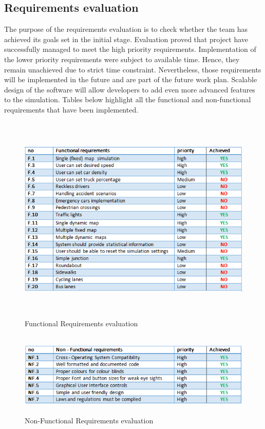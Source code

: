 \subsection{Requirements evaluation}
  The purpose of the requirements evaluation is to check whether the team has achieved its goals set in the initial stage. Evaluation proved that project have successfully managed to meet the high priority requirements. Implementation of the lower priority requirements were subject to available time. Hence, they remain unachieved due to strict time constraint. Nevertheless, those requirements will be implemented in the future and are part of the future work plan. Scalable design of the software will allow developers to add even more advanced features to the simulation. Tables below highlight all the functional and non-functional requirements that have been implemented.

\begin{figure}[H]
\includegraphics[width=14cm, height=10cm]{pics/FR_EVAL}
\centering
\caption{Functional Requirements evaluation}
\end{figure}


\begin{figure}[H]
\includegraphics[width=14cm, height=4cm]{pics/NFR_EVAL}
\centering
\caption{Non-Functional Requirements evaluation}
\end{figure}

